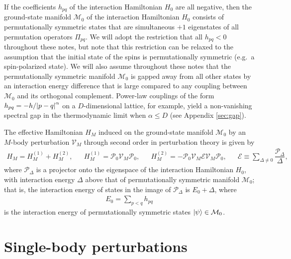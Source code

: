 \documentclass[nofootinbib,notitlepage,11pt]{revtex4-2}
\newcommand{\f}[2]{\dfrac{#1}{#2}} %
\newcommand{\1}{\mathds{1}}
\newcommand{\E}{\mathcal{E}}
\newcommand{\M}{\mathcal{M}}
\renewcommand{\P}{\mathcal{P}}
\newcommand{\V}{\mathcal{V}}
\begin{document}
If the coefficients $h_{pq}$ of the interaction Hamiltonian $H_0$ are
all negative, then the ground-state manifold $\M_0$ of the interaction
Hamiltonian $H_0$ consists of permutationally symmetric states that
are simultaneous $+1$ eigenstates of all permutation operators
$\Pi_{pq}$.  We will adopt the restriction that all $h_{pq}<0$
throughout these notes, but note that this restriction can be relaxed
to the assumption that the initial state of the spins is
permutationally symmetric (e.g.~a spin-polarized state).  We will also
assume throughout these notes that the permutationally symmetric
manifold $\M_0$ is gapped away from all other states by an interaction
energy difference that is large compared to any coupling between
$\M_0$ and its orthogonal complement.  Power-law couplings of the form
$h_{pq}=-h/\abs{p-q}^\alpha$ on a $D$-dimensional lattice, for
example, yield a non-vanishing spectral gap in the thermodynamic limit
when $\alpha\le D$ (see Appendix \ref{sec:gap}).

The effective Hamiltonian $H_M$ induced on the ground-state manifold
$\M_0$ by an $M$-body perturbation $\V_M$ through second order in
perturbation theory is given by\cite{bravyi2011schrieffer,
  perlin2019effective}
\begin{align}
  H_M = H_M^{(1)} + H_M^{(2)},
  &&
  H_M^{(1)} = \P_0 \V_M \P_0,
  &&
  H_M^{(2)} = - \P_0 \V_M \E \V_M \P_0,
  &&
  \E \equiv \sum_{\Delta\ne0} \f{\P_\Delta}{\Delta},
\end{align}
where $\P_\Delta$ is a projector onto the eigenspace of the
interaction Hamiltonian $H_0$, with interaction energy $\Delta$ above
that of permutationally symmetric manifold $\M_0$; that is, the
interaction energy of states in the image of $\P_\Delta$ is
$E_0+\Delta$, where
\begin{align}
  E_0 = \sum_{p<q} h_{pq}
\end{align}
is the interaction energy of permutationally symmetric states
$\ket\psi\in\M_0$.

\section{Single-body perturbations}
\label{sec:single_body_pert}
\end{document}
